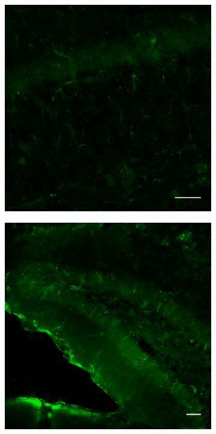 \begin{figure}[h]
		\begin{subfigure}[h]{0.245\textwidth}
			\caption{}
			\label{fig:locaMuSKca1}
			\includegraphics[width=\textwidth]{./Images/Immuno/Musk/MuSK_ca1_50um.jpg}
		\end{subfigure}
		\begin{subfigure}[h]{0.245\textwidth}
			\caption{}
			\label{fig:locaMuSKdg}
			\includegraphics[width=\textwidth]{./Images/Immuno/Musk/MuSK_dg_50um.jpg}

\end{subfigure}
\end{figure}
